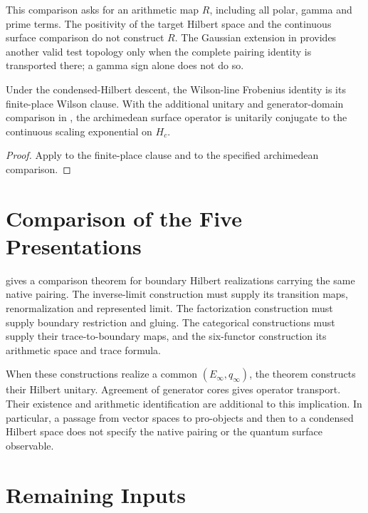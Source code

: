 This comparison asks for an arithmetic map \(R\), including all
polar, gamma and prime terms. The positivity of the target Hilbert
space and the continuous surface comparison do not construct \(R\).
The Gaussian extension in 
provides another valid test topology only when the complete pairing
identity is transported there; a gamma sign alone does not do so.
\begin{corollary}
\label{v4-arith:w10-a:cor:wilson-one-residual}
Under the condensed-Hilbert descent, the Wilson-line Frobenius identity
is its finite-place Wilson clause. With the additional unitary and
generator-domain comparison in
, the archimedean
surface operator is unitarily conjugate to the continuous scaling
exponential on \(H_c\).
\end{corollary}

\begin{proof}
Apply  to the finite-place
clause and  to the
specified archimedean comparison.
\end{proof}

\section{Comparison of the Five Presentations}
\label{v4-arith:w10-a:ah:synthesis}

 gives a comparison theorem
for boundary Hilbert realizations carrying the same native pairing.
The inverse-limit construction must supply its transition maps,
renormalization and represented limit. The factorization construction
must supply boundary restriction and gluing. The categorical
constructions must supply their trace-to-boundary maps, and the
six-functor construction its arithmetic space and trace formula.

When these constructions realize a common \((E_\infty,q_\infty)\),
the theorem constructs their Hilbert unitary. Agreement of generator
cores gives operator transport. Their existence and arithmetic
identification are additional to this implication. In particular,
a passage from vector spaces to pro-objects and then to a condensed
Hilbert space does not specify the native pairing or the quantum
surface observable.
\section{Remaining Inputs}
\label{v4-arith:w10-a:residual}

